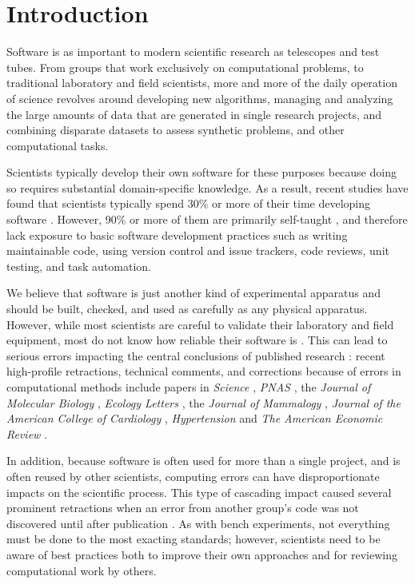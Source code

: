 \documentclass[10pt]{article}
\begin{document}
\section*{Introduction}

Software is as important to modern scientific research as telescopes and test
tubes. From groups that work exclusively on computational problems, to
traditional laboratory and field scientists, more and more of the daily
operation of science revolves around developing
new algorithms, managing and analyzing the large amounts of data that are
generated in single research projects, and combining disparate
datasets to assess synthetic problems, and other computational tasks.

Scientists typically develop their own software for these purposes
because doing so requires substantial domain-specific knowledge. As a
result, recent studies have found that scientists typically spend 30\%
or more of their time developing software
\cite{hannay2008,prabhu2011}.  However, 90\% or more of them are
primarily self-taught \cite{hannay2008,prabhu2011}, and therefore lack
exposure to basic software development practices such as writing
maintainable code, using version control and issue trackers, code
reviews, unit testing, and task automation.

We believe that software is just another kind of experimental
apparatus \cite{vardi2010} and should be built, checked, and used as
carefully as any physical apparatus.  However, while most scientists
are careful to validate their laboratory and field equipment, most do
not know how reliable their software is
\cite{hatton1994,hatton1997}. This can lead to serious errors
impacting the central conclusions of published research
\cite{merali2010}: recent high-profile retractions, technical
comments, and corrections because of errors in computational methods
include papers in \emph{Science} \cite{chang2006,ferrari2013},
\emph{PNAS} \cite{ma2007}, the \emph{Journal of Molecular Biology}
\cite{chang2007}, \emph{Ecology Letters} \cite{lees2007,currie2007},
the \emph{Journal of Mammalogy} \cite{kelt2008}, \emph{Journal of the
  American College of Cardiology} \cite{jaccretract2013},
\emph{Hypertension} \cite{hypertension2012}
and \emph{The American Economic Review} \cite{herndon2013}.

In addition, because software is often used for more than a single
project, and is often reused by other scientists, computing errors can
have disproportionate impacts on the scientific process. This type of
cascading impact caused several prominent retractions when an error
from another group's code was not discovered until after publication
\cite{merali2010}.  As with bench experiments, not everything must be
done to the most exacting standards; however, scientists need to be
aware of best practices both to improve their own approaches and for
reviewing computational work by others.
\end{document}
